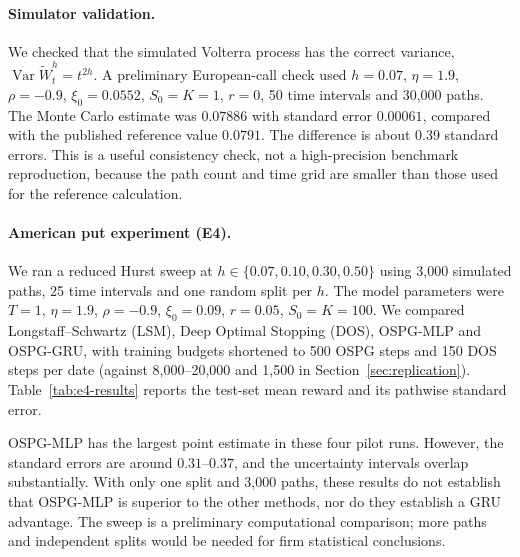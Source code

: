 \paragraph{Simulator validation.}
We checked that the simulated Volterra process has the correct variance,
$\operatorname{Var}\widetilde W_t^h=t^{2h}$. A preliminary
European-call check used $h=0.07$, $\eta=1.9$, $\rho=-0.9$,
$\xi_0=0.0552$, $S_0=K=1$, $r=0$, 50 time intervals and 30,000 paths.
The Monte Carlo estimate was $0.07886$ with standard error $0.00061$,
compared with the published reference value $0.0791$. The difference is
about 0.39 standard errors. This is a useful consistency check, not a
high-precision benchmark reproduction, because the path count and time
grid are smaller than those used for the reference calculation.

\paragraph{American put experiment (E4).}
We ran a reduced Hurst sweep at $h\in\{0.07,0.10,0.30,0.50\}$ using
3,000 simulated paths, 25 time intervals and one random split per $h$.
The model parameters were $T=1$, $\eta=1.9$, $\rho=-0.9$,
$\xi_0=0.09$, $r=0.05$, $S_0=K=100$. We compared Longstaff--Schwartz
(LSM), Deep Optimal Stopping (DOS), OSPG-MLP and OSPG-GRU, with training
budgets shortened to 500 OSPG steps and 150 DOS steps per date (against 8{,}000--20{,}000
and 1{,}500 in Section~\ref{sec:replication}). Table~\ref{tab:e4-results} reports the
test-set mean reward and its pathwise standard error.

\begin{table}[ht]
\centering
\small
\caption{Reduced E4 American put results under hybrid rough Bergomi.
Entries are mean discounted payoffs (standard error).}
\label{tab:e4-results}

\end{table}

OSPG-MLP has the largest point estimate in these four pilot runs.
However, the standard errors are around $0.31$--$0.37$, and the
uncertainty intervals overlap substantially. With only one split and
3,000 paths, these results do not establish that OSPG-MLP is superior
to the other methods, nor do they establish a GRU advantage. The sweep
is a preliminary computational comparison; more paths and independent
splits would be needed for firm statistical conclusions.
